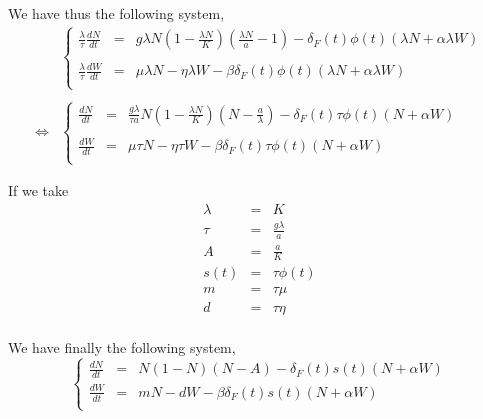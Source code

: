 \documentclass{article}
\begin{document}
\paragraph{}
We have thus the following system,
\[
\begin{array}{rl}
& 

\left\lbrace
\begin{array}{rcl}
\frac{\lambda}{\tau}\frac{dN}{dt} & = & g\lambda N(1-\frac{\lambda N}{K})(\frac{\lambda N}{a}-1) - \delta_F(t)\phi(t)(\lambda N+\alpha \lambda W) \\
\\
\frac{\lambda}{\tau}\frac{dW}{dt} & = & \mu \lambda N -\eta \lambda W - \beta\delta_F(t)\phi(t)(\lambda N+\alpha \lambda W) \\
\end{array}
\right.
\\
\\
\Leftrightarrow & 
\left\lbrace
\begin{array}{rcl}
\frac{dN}{dt} & = & \frac{g \lambda}{\tau a} N(1-\frac{\lambda N}{K})(N-\frac{a}{\lambda}) - \delta_F(t)\tau\phi(t)(N+\alpha W) \\
\\
\frac{dW}{dt} & = & \mu \tau N -\eta \tau W - \beta\delta_F(t)\tau\phi(t)(N+\alpha W) \\
\end{array}
\right.
\end{array}
\]


If we take 
\[
\begin{array}{rcl}
\lambda & = & K \\
\tau & = & \frac{g\lambda}{a} \\
A & = & \frac{a}{K} \\
s(t) & = & \tau\phi(t) \\
m & = & \tau\mu \\
d & = & \tau\eta
\end{array}
\]
\paragraph{}
We have finally the following system,
\[
\left\lbrace
\begin{array}{rcl}
\frac{dN}{dt} & = & N(1-N)(N-A) - \delta_F(t)s(t)(N+\alpha W) \\
\frac{dW}{dt} & = & mN -dW - \beta\delta_F(t)s(t)(N+\alpha W) \\
\end{array}
\right.
\]
\end{document}
